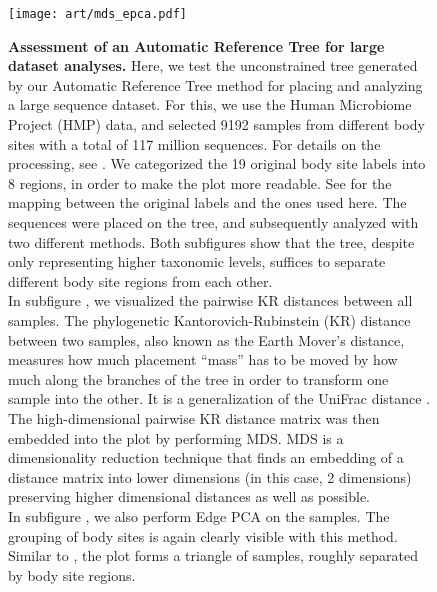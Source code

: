 \begin{figure}[hpbt]
    \centering
    \texttt{[image: art/mds\_epca.pdf]}
    \begin{subfigure}{0pt}
        \label{fig:hmp_mds_epca:sub:mds}
    \end{subfigure}
    \begin{subfigure}{0pt}
        \label{fig:hmp_mds_epca:sub:edge_pca}
    \end{subfigure}
    \caption[Assessment of an Automatic Reference Tree for large dataset analyses]{
        \textbf{Assessment of an Automatic Reference Tree for large dataset analyses.}
        Here, we test the unconstrained  tree generated by our Automatic Reference Tree method
        for placing and analyzing a large sequence dataset.
        For this, we use the Human Microbiome Project (HMP) \citep{Huttenhower2012,Methe2012} data,
        and selected \num{9192} samples from different body sites with a total of 117 million sequences.
        For details on the processing, see .
        We categorized the 19 original body site labels into 8 regions, in order to make the plot more readable.
        See  for the mapping between the original labels and the ones used here.
        The sequences were placed on the tree, and subsequently analyzed with two different methods.
        Both subfigures show that the tree, despite only representing higher taxonomic levels,
        suffices to separate different body site regions from each other.
        \\
        In subfigure , we visualized the pairwise KR distances between all samples.
        The phylogenetic Kantorovich-Rubinstein (KR) distance \citep{Matsen2011a,Evans2012} between two samples,
        also known as the Earth Mover's distance,
        measures how much placement ``mass'' has to be moved by how much along the branches of the tree
        in order to transform one sample into the other.
        It is a generalization of the UniFrac distance \citep{Lozupone2005,Lozupone2007a}.
        The high-dimensional pairwise KR distance matrix was then embedded into the plot by performing \acf{MDS}.
        \ac{MDS} \citep{Mardia1978,Krzanowski1994,Everitt2010} is a dimensionality reduction technique that
        finds an embedding of a distance matrix into lower dimensions (in this case, \num{2} dimensions)
        preserving higher dimensional distances as well as possible.
        \\
        In subfigure , we also perform Edge PCA \citep{Matsen2011a}
        on the samples.
        The grouping of body sites is again clearly visible with this method.
        Similar to , the plot forms a triangle of samples,
        roughly separated by body site regions.
    }
    \label{fig:hmp_mds_epca}
\end{figure}

